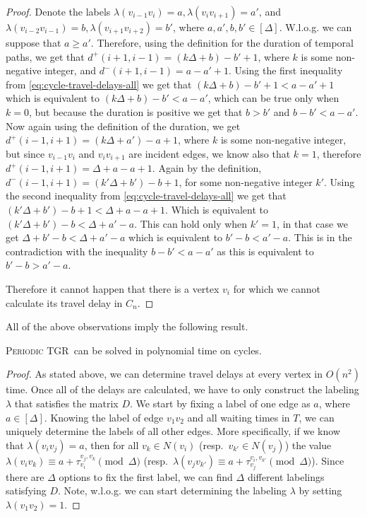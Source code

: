 \documentclass[a4paper,UKenglish,cleveref, autoref, thm-restate]{lipics-v2021}
\newcommand{\deltaExact}{\textsc{Periodic TGR}}
\begin{document}
\begin{proof}
    Denote the labels $\lambda(v_{i-1}v_i) = a, \lambda(v_{i}v_{i+1})=a'$, and $\lambda(v_{i-2}v_{i-1}) = b, \lambda (v_{i+1}v_{i+2})=b'$, where $a,a',b,b' \in [\Delta]$.
    W.l.o.g. we can suppose that $a \geq a'$.
    Therefore, using the definition for the duration of temporal paths, we get that
    $d^+(i+1,i-1) = (k \Delta + b) - b' + 1$, where $k$ is some non-negative integer, and $d^-(i+1,i-1) = a - a' + 1$.
    Using the first inequality from \cref{eq:cycle-travel-delays-all} we get that 
    $(k \Delta + b) - b' +1 < a - a' + 1$ which is equivalent to $(k \Delta + b) - b' < a - a'$, which can be true only when $k = 0$, but because the duration is positive we get that $b > b'$ and
    $b - b' < a - a'$.
    Now again using the definition of the duration, we get
    $d^+(i-1,i+1)= (k\Delta + a') - a + 1$, where $k$ is some non-negative integer, but since $v_{i-1}v_i$ and $v_iv_{i+1}$ are incident edges, we know also that $k=1$, therefore $d^+(i-1,i+1)= \Delta + a - a + 1$. 
    Again by the definition, $d^-(i-1,i+1) = (k' \Delta + b') -b + 1$, for some non-negative integer $k'$.
    Using the second inequality from \cref{eq:cycle-travel-delays-all} we get that 
    $(k' \Delta + b') -b + 1 < \Delta + a - a + 1$.
    Which is equivalent to  $(k' \Delta + b') -b < \Delta + a' - a $. This can hold only when $k' = 1$, in that case we get $ \Delta + b' -b < \Delta + a' - a $ which is equivalent to $b' -b < a' - a$.
    This is in the contradiction with the inequality  $b - b' < a - a'$ as this is equivalent to $b'-b > a'-a$.
    
    Therefore it cannot happen that there is a vertex $v_i$ for which we cannot calculate its travel delay in $C_n$.
\end{proof}

All of the above observations imply the following result.
\begin{theorem}
    \deltaExact\ can be solved in polynomial time on cycles.
\end{theorem}

\begin{proof}
As stated above, we can determine travel delays at every vertex in $O(n^2)$ time. 
Once all of the delays are calculated, we have to only construct the labeling $\lambda$ that satisfies the matrix $D$. 
We start by fixing a label of one edge as $a$, where $a \in [\Delta]$.
Knowing the label of edge $v_1v_2$ and all waiting times in $T$, we can uniquely determine the labels of all other edges.
More specifically, if we know that $\lambda(v_i v_j) = a$, then for all $v_k \in N(v_i)$ (resp.~$v_{k'} \in N(v_j)$)
the value $\lambda(v_iv_k) \equiv a + \tau_{v_i}^{v_j,v_k} \pmod \Delta $ (resp.~$\lambda(v_j v_{k'}) \equiv a + \tau_{v_j}^{v_i,v_{k'}} \pmod \Delta $).
Since there are $\Delta$ options to fix the first label, we can find $\Delta$ different labelings satisfying $D$.
Note, w.l.o.g. we can start determining the labeling $\lambda$ by setting $\lambda(v_1v_2) = 1$.
\end{proof}
\end{document}
